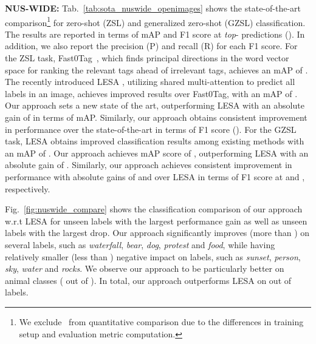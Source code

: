 \documentclass[10pt,journal,compsoc]{IEEEtran}
\begin{document}
\noindent\textbf{NUS-WIDE:} 
Tab.~\ref{tab:sota_nuswide_openimages} shows the state-of-the-art comparison\footnote{We exclude~\cite{ou2020multi,ji2020deep} from quantitative comparison due to the differences in training setup and evaluation metric computation.} for zero-shot (ZSL) and generalized zero-shot (GZSL) classification. The results are reported in terms of mAP and F1 score at \textit{top}- predictions (). In addition, we also report the precision (P) and recall (R) for each F1 score.  For the ZSL task, Fast0Tag~\cite{zhang2016fast}, which finds principal directions in the word vector space for ranking the relevant tags ahead of irrelevant tags, achieves an mAP of . The recently introduced LESA \cite{huynh2020shared}, utilizing shared multi-attention to predict all labels in an image, achieves improved results over Fast0Tag, with an mAP of . Our approach sets a new state of the art, outperforming LESA with an absolute gain of  in terms of mAP. Similarly, our approach obtains consistent improvement in performance over the state-of-the-art in terms of F1 score ().
For the GZSL task, LESA obtains improved classification results among existing methods with an mAP of . Our approach achieves mAP score of , outperforming LESA with an absolute gain of . Similarly, our approach achieves consistent improvement in performance with absolute gains of  and  over LESA in terms of F1 score at  and , respectively. 

Fig.~\ref{fig:nuswide_compare} shows the classification comparison of our approach w.r.t LESA for  unseen labels with the largest
performance gain as well as  unseen labels with the largest drop. Our approach significantly improves (more than ) on several labels, such as \textit{waterfall}, \textit{bear}, \textit{dog}, \textit{protest} and \textit{food}, while having relatively smaller (less than ) negative impact on labels, such as \textit{sunset}, \textit{person}, \textit{sky}, \textit{water} and \textit{rocks}. We observe our approach to be particularly better on animal classes ( out of ). In total, our approach outperforms LESA on  out of  labels. \\
\end{document}
